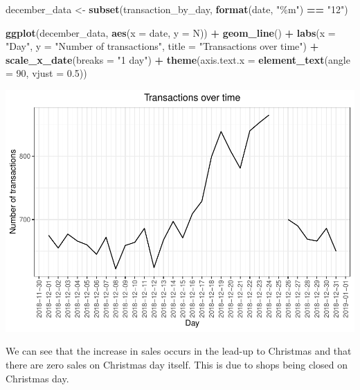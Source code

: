 \documentclass[
]{article}
\newenvironment{Shaded}{\begin{snugshade}}{\end{snugshade}}
\newcommand{\AttributeTok}[1]{\textcolor[rgb]{0.13,0.29,0.53}{#1}}
\newcommand{\DecValTok}[1]{\textcolor[rgb]{0.00,0.00,0.81}{#1}}
\newcommand{\FloatTok}[1]{\textcolor[rgb]{0.00,0.00,0.81}{#1}}
\newcommand{\FunctionTok}[1]{\textcolor[rgb]{0.13,0.29,0.53}{\textbf{#1}}}
\newcommand{\NormalTok}[1]{#1}
\newcommand{\OtherTok}[1]{\textcolor[rgb]{0.56,0.35,0.01}{#1}}
\newcommand{\SpecialCharTok}[1]{\textcolor[rgb]{0.81,0.36,0.00}{\textbf{#1}}}
\newcommand{\StringTok}[1]{\textcolor[rgb]{0.31,0.60,0.02}{#1}}
\begin{document}
\begin{Shaded}
\begin{Highlighting}[]
\NormalTok{december\_data }\OtherTok{\textless{}{-}} \FunctionTok{subset}\NormalTok{(transaction\_by\_day, }\FunctionTok{format}\NormalTok{(date, }\StringTok{"\%m"}\NormalTok{) }\SpecialCharTok{==} \StringTok{"12"}\NormalTok{)}

\FunctionTok{ggplot}\NormalTok{(december\_data, }\FunctionTok{aes}\NormalTok{(}\AttributeTok{x =}\NormalTok{ date, }\AttributeTok{y =}\NormalTok{ N)) }\SpecialCharTok{+}
\FunctionTok{geom\_line}\NormalTok{() }\SpecialCharTok{+}
\FunctionTok{labs}\NormalTok{(}\AttributeTok{x =} \StringTok{"Day"}\NormalTok{, }\AttributeTok{y =} \StringTok{"Number of transactions"}\NormalTok{, }\AttributeTok{title =} \StringTok{"Transactions over time"}\NormalTok{) }\SpecialCharTok{+}
\FunctionTok{scale\_x\_date}\NormalTok{(}\AttributeTok{breaks =} \StringTok{"1 day"}\NormalTok{) }\SpecialCharTok{+}  \FunctionTok{theme}\NormalTok{(}\AttributeTok{axis.text.x =} \FunctionTok{element\_text}\NormalTok{(}\AttributeTok{angle =} \DecValTok{90}\NormalTok{, }\AttributeTok{vjust =} \FloatTok{0.5}\NormalTok{))}
\end{Highlighting}
\end{Shaded}

\begin{center}\includegraphics{quantium_analysis_files/figure-latex/unnamed-chunk-18-1} \end{center}

We can see that the increase in sales occurs in the lead-up to Christmas
and that there are zero sales on Christmas day itself. This is due to
shops being closed on Christmas day.
\end{document}
